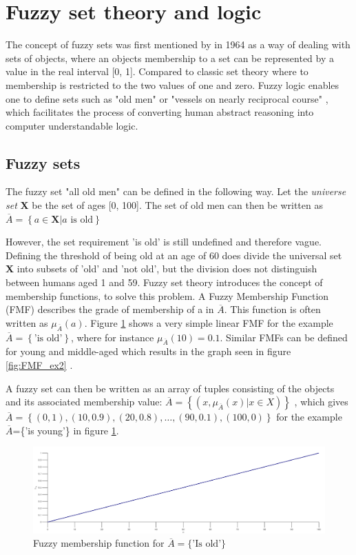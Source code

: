 \section{Fuzzy set theory and logic}
The concept of fuzzy sets was first mentioned by \textcite{zadeh1996fuzzy} in 1964 as a way of dealing with sets of objects, where an objects membership to a set can be represented by a value in the real interval [0, 1]. Compared to classic set theory where to membership is restricted to the two values of one and zero. Fuzzy logic enables one to define sets such as "old men" or "vessels on nearly reciprocal course" \cite{zadeh1996fuzzy}, which facilitates the process of converting human abstract reasoning into computer understandable logic.

\subsection{Fuzzy sets}
The fuzzy set "all old men" can be defined in the following way. Let the \textit{universe set} \textbf{X} be the set of ages [0, 100]. The set of old men can then be written as
$\overbar{A}=\left \{ a \in \textbf{X} | a \text{ is old} \right \}$
\cite{chen2000introduction}

However, the set requirement 'is old' is still undefined and therefore vague. Defining the threshold of being old at an age of 60 does divide the universal set \textbf{X} into subsets of 'old' and 'not old', but the division does not distinguish between humans aged 1 and 59.
Fuzzy set theory introduces the concept of membership functions, to solve this problem. A Fuzzy Membership Function (FMF) describes the grade of membership of a  in  $\overbar{A}$. This function is often written as $\mu_{\overbar{A}}(a)$. Figure \ref{fig:FMF_ex} shows a very simple linear FMF for the example $\overbar{A}=\left \{\text{'is old'} \right \}$, where for instance $\mu_{\overbar{A}}(10)=0.1$. Similar FMFs can be defined for young and middle-aged which results in the graph seen in figure \ref{fig:FMF_ex2} \cite{ross2009fuzzy}.

A fuzzy set can then be written as an array of tuples consisting of the objects and its associated membership value: $\overbar{A}=\left \{(x,\mu_{\overbar{A}}(x)|x \in X) \right \}$ \cite{zimmermann2010fuzzy}, which gives \\ $\overbar{A}=\left \{(0,1),(10,0.9),(20,0.8),\dots,(90,0.1),(100,0) \right \}$ for the example $\overbar{A}$=\{'is young'\} in figure \ref{fig:FMF_ex}.
\begin{figure}
    \centering
    \includegraphics[width=\textwidth]{FMF_ex}
    \caption{Fuzzy membership function for $\overbar{A}=\{\text{'Is old'}\}$}
    \label{fig:FMF_ex}
\end{figure}

